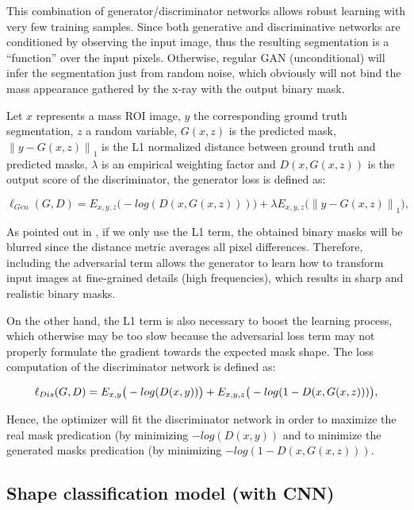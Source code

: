 \documentclass[runningheads,a4paper]{llncs}
\newcommand\norm[1]{\left\lVert#1\right\rVert}
\begin{document}
This combination of generator/discriminator networks allows robust learning with very few training samples. Since both generative and discriminative networks are conditioned by observing the input image, thus the resulting segmentation is a “function” over the input pixels. Otherwise, regular GAN (unconditional) will infer the segmentation just from random noise, which obviously will not bind the mass appearance gathered by the x-ray with the output binary mask.

Let $x$ represents a mass ROI image, $y$ the corresponding ground truth segmentation, $z$ a random variable, $G(x, z)$ is the predicted mask, $\norm{ y-G(x, z)}_{1}$ is the L1 normalized distance between ground truth and predicted masks, $\lambda$ is an empirical weighting factor and $D(x, G(x, z))$ is the output score of the discriminator, the generator loss is defined as:

\begin{equation}
\ell_{Gen} (G,D) = E_{x,y,z} \big(-log (D(x,G(x,z)))\big)+ \lambda E_{x,y,z} \big(\norm{y-G(x,z)}_{1}\big), 
\end{equation}

As pointed out in \cite{isola2017image}, if we only use the L1 term, the obtained binary masks will be blurred since the distance metric averages all pixel differences. Therefore, including the adversarial term allows the generator to learn how to transform input images at fine-grained details (high frequencies), which results in sharp and realistic binary masks.

On the other hand, the L1 term is also necessary to boost the learning process, which otherwise may be too slow because the adversarial loss term may not properly formulate the gradient towards the expected mask shape.
The loss computation of the discriminator network is defined as:

\begin{equation}
\small
\ell_{Dis} (G,D) = E_{x,y} \big(-log (D(x,y))\big)+ E_{x,y,z} \big(-log (1-D(x,G(x,z)))\big),
\end{equation}

Hence, the optimizer will fit the discriminator network in order to maximize the real mask predication (by minimizing $-log (D(x, y))$ and to minimize the generated masks predication (by minimizing $-log (1-D(x, G(x, z)))$. 


\subsection{Shape classification model (with CNN) }
\end{document}
